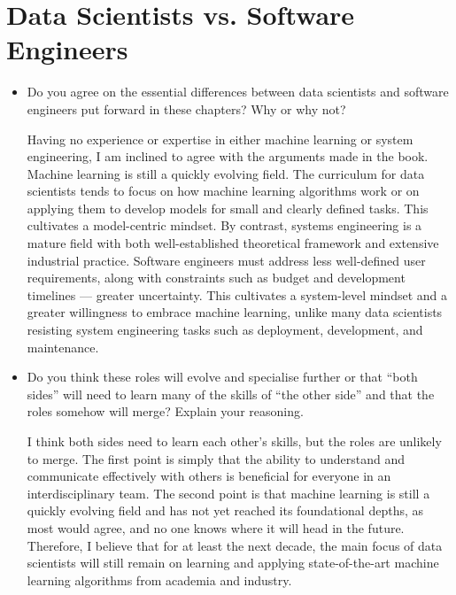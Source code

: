 \documentclass[11pt]{article}
\begin{document}
\section{Data Scientists vs. Software Engineers}
\begin{itemize}
    \item Do you agree on the essential differences between data scientists and software engineers put forward in these chapters? Why or why not? \par
    Having no experience or expertise in either machine learning or system engineering, I am inclined to agree with the arguments made in the book. Machine learning is still a quickly evolving field. The curriculum for data scientists tends to focus on how machine learning algorithms work or on applying them to develop models for small and clearly defined tasks. This cultivates a model-centric mindset. By contrast, systems engineering is a mature field with both well-established theoretical framework and extensive industrial practice. Software engineers must address less well-defined user requirements, along with constraints such as budget and development timelines --- greater uncertainty. This cultivates a system-level mindset and a greater willingness to embrace machine learning, unlike many data scientists resisting system engineering tasks such as deployment, development, and maintenance.
    \item Do you think these roles will evolve and specialise further or that “both sides” will need to learn many of the skills of “the other side” and that the roles somehow will merge? Explain your reasoning. \par
    I think both sides need to learn each other's skills, but the roles are unlikely to merge. The first point is simply that the ability to understand and communicate effectively with others is beneficial for everyone in an interdisciplinary team. The second point is that machine learning is still a quickly evolving field and has not yet reached its foundational depths, as most would agree, and no one knows where it will head in the future. Therefore, I believe that for at least the next decade, the main focus of data scientists will still remain on learning and  applying state-of-the-art machine learning algorithms from academia and industry. 
\end{itemize}
\end{document}

